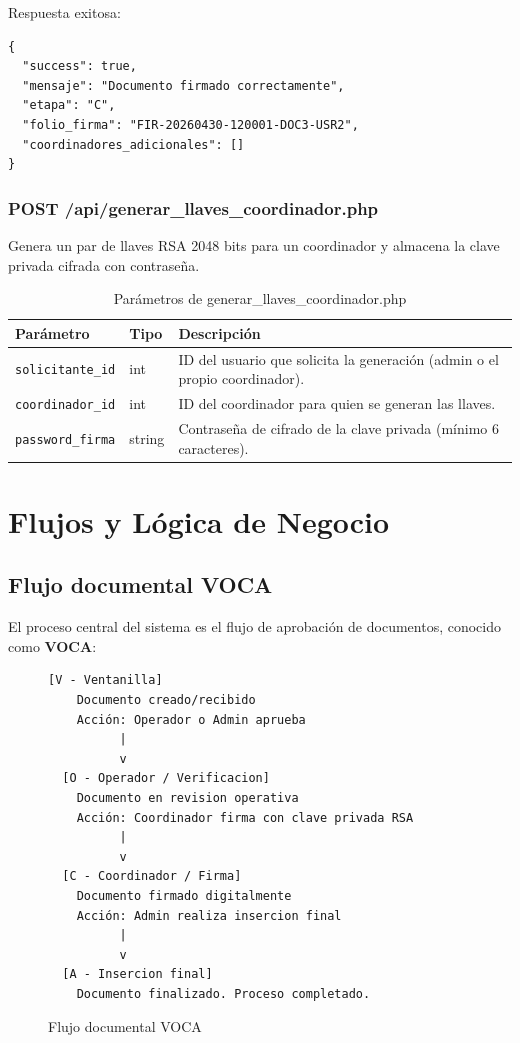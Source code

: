 \documentclass[10pt,letterpaper]{report}
\begin{document}
Respuesta exitosa:
\begin{lstlisting}[style=bashstyle]
{
  "success": true,
  "mensaje": "Documento firmado correctamente",
  "etapa": "C",
  "folio_firma": "FIR-20260430-120001-DOC3-USR2",
  "coordinadores_adicionales": []
}
\end{lstlisting}

\subsection{POST /api/generar\_llaves\_coordinador.php}

Genera un par de llaves RSA 2048 bits para un coordinador y almacena la clave privada cifrada con contraseña.

\begin{table}[H]
\centering
\caption{Parámetros de generar\_llaves\_coordinador.php}
\label{tab:api-llaves}
\begin{tabular}{p{} p{} p{}}
\toprule
\textbf{Parámetro} & \textbf{Tipo} & \textbf{Descripción} \\
\midrule
\texttt{solicitante\_id} & int & ID del usuario que solicita la generación (admin o el propio coordinador). \\
\texttt{coordinador\_id} & int & ID del coordinador para quien se generan las llaves. \\
\texttt{password\_firma} & string & Contraseña de cifrado de la clave privada (mínimo 6 caracteres). \\
\bottomrule
\end{tabular}
\end{table}

\chapter{Flujos y Lógica de Negocio}

\section{Flujo documental VOCA}

El proceso central del sistema es el flujo de aprobación de documentos, conocido como \textbf{VOCA}:

\begin{figure}[H]
\centering
\begin{Verbatim}[frame=single,rulecolor=\color{gray!40},fontsize=\small]
  [V - Ventanilla]
    Documento creado/recibido
    Acción: Operador o Admin aprueba
          |
          v
  [O - Operador / Verificacion]
    Documento en revision operativa
    Acción: Coordinador firma con clave privada RSA
          |
          v
  [C - Coordinador / Firma]
    Documento firmado digitalmente
    Acción: Admin realiza insercion final
          |
          v
  [A - Insercion final]
    Documento finalizado. Proceso completado.
\end{Verbatim}
\caption{Flujo documental VOCA}
\label{fig:flujo-voca}
\end{figure}
\end{document}
